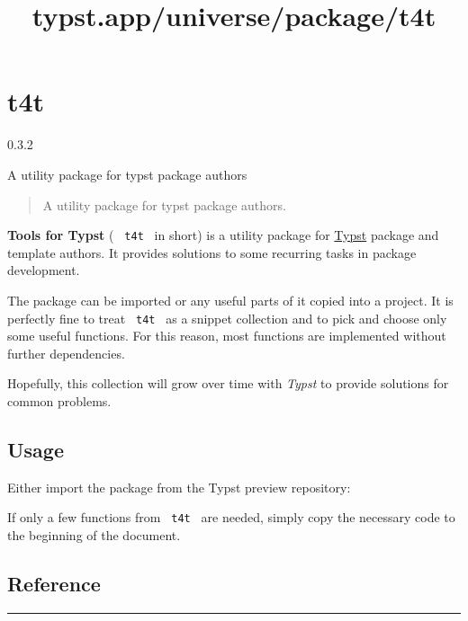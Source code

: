 \title{typst.app/universe/package/t4t}

\label{banner}
\section{t4t}\label{t4t}

{ 0.3.2 }

A utility package for typst package authors

\label{readme}
\begin{quote}
A utility package for typst package authors.
\end{quote}

\textbf{Tools for Typst} ( \texttt{\ t4t\ } in short) is a utility
package for
\href{https://github.com/typst/packages/raw/main/packages/preview/t4t/0.3.2/typst/typst}{Typst}
package and template authors. It provides solutions to some recurring
tasks in package development.

The package can be imported or any useful parts of it copied into a
project. It is perfectly fine to treat \texttt{\ t4t\ } as a snippet
collection and to pick and choose only some useful functions. For this
reason, most functions are implemented without further dependencies.

Hopefully, this collection will grow over time with \emph{Typst} to
provide solutions for common problems.

\subsection{Usage}\label{usage}

Either import the package from the Typst preview repository:

\begin{Shaded}
\begin{Highlighting}[]
\OperatorTok{:} \OperatorTok{*}
\end{Highlighting}
\end{Shaded}

If only a few functions from \texttt{\ t4t\ } are needed, simply copy
the necessary code to the beginning of the document.

\subsection{Reference}\label{reference}

\begin{center}\rule{0.5\linewidth}{0.5pt}\end{center}

